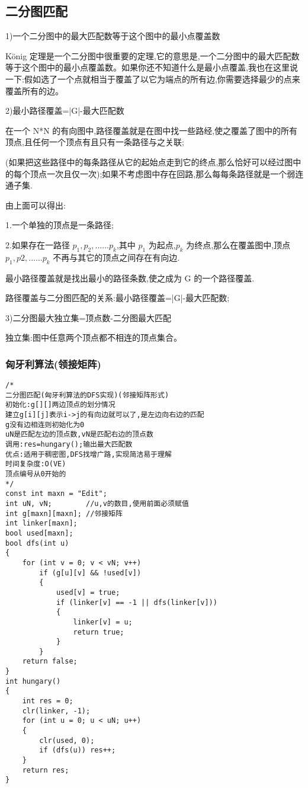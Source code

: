 \documentclass[a4]{article}
\begin{document}
\subsection{二分图匹配}
1)一个二分图中的最大匹配数等于这个图中的最小点覆盖数

König 定理是一个二分图中很重要的定理,它的意思是,一个二分图中的最大匹配数等于这个图中的最小点覆盖数。如果你还不知道什么是最小点覆盖,我也在这里说一下:假如选了一个点就相当于覆盖了以它为端点的所有边,你需要选择最少的点来覆盖所有的边。

2)最小路径覆盖=|G|-最大匹配数

在一个 N*N 的有向图中,路径覆盖就是在图中找一些路经,使之覆盖了图中的所有顶点,且任何一个顶点有且只有一条路径与之关联;

(如果把这些路径中的每条路径从它的起始点走到它的终点,那么恰好可以经过图中的每个顶点一次且仅一次);如果不考虑图中存在回路,那么每每条路径就是一个弱连通子集.

由上面可以得出:

1.一个单独的顶点是一条路径;

2.如果存在一路径 $p_1,p_2,......p_k$,其中 $p_1$ 为起点,$p_k$ 为终点,那么在覆盖图中,顶点 $p_1,p2,......p_k$ 不再与其它的顶点之间存在有向边.

最小路径覆盖就是找出最小的路径条数,使之成为 G 的一个路径覆盖.

路径覆盖与二分图匹配的关系:最小路径覆盖=|G|-最大匹配数;

3)二分图最大独立集=顶点数-二分图最大匹配

独立集:图中任意两个顶点都不相连的顶点集合。
\subsubsection{匈牙利算法(领接矩阵)}
\begin{lstlisting}
/*
二分图匹配(匈牙利算法的DFS实现)(邻接矩阵形式)
初始化:g[][]两边顶点的划分情况
建立g[i][j]表示i->j的有向边就可以了,是左边向右边的匹配
g没有边相连则初始化为0
uN是匹配左边的顶点数,vN是匹配右边的顶点数
调用:res=hungary();输出最大匹配数
优点:适用于稠密图,DFS找增广路,实现简洁易于理解
时间复杂度:O(VE)
顶点编号从0开始的
*/
const int maxn = "Edit";
int uN, vN;        //u,v的数目,使用前面必须赋值
int g[maxn][maxn]; //邻接矩阵
int linker[maxn];
bool used[maxn];
bool dfs(int u)
{
    for (int v = 0; v < vN; v++)
        if (g[u][v] && !used[v])
        {
            used[v] = true;
            if (linker[v] == -1 || dfs(linker[v]))
            {
                linker[v] = u;
                return true;
            }
        }
    return false;
}
int hungary()
{
    int res = 0;
    clr(linker, -1);
    for (int u = 0; u < uN; u++)
    {
        clr(used, 0);
        if (dfs(u)) res++;
    }
    return res;
}
\end{lstlisting}
\end{document}
